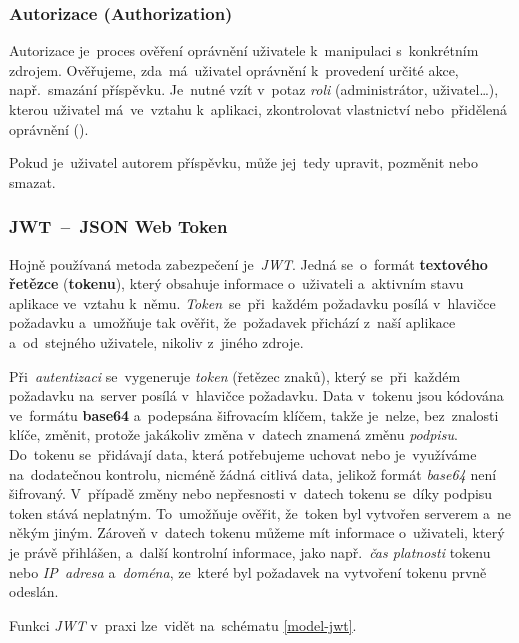 \documentclass[10pt,a4paper]{article}
\begin{document}
            \subsubsection{Autorizace (Authorization)}
                Autorizace je~proces ověření oprávnění uživatele k~manipulaci s~konkrétním zdrojem. Ověřujeme, zda~má~uživatel oprávnění k~provedení určité akce, např.~smazání příspěvku. Je~nutné vzít v~potaz \emph{roli} (administrátor, uživatel\dots), kterou uživatel má~ve~vztahu k~aplikaci, zkontrolovat vlastnictví nebo~přidělená oprávnění ().

                Pokud je~uživatel autorem příspěvku, může jej~tedy upravit, pozměnit nebo smazat. \cite{graham2021ethical}

            \subsubsection{JWT~--~JSON Web Token}
                Hojně používaná metoda zabezpečení je~\emph{JWT}. Jedná se~o~formát \textbf{textového řetězce} (\textbf{tokenu}), který obsahuje informace o~uživateli a~aktivním stavu aplikace ve~vztahu k~němu. \emph{Token}~se~při~každém požadavku posílá v~hlavičce požadavku a~umožňuje tak ověřit, že~požadavek přichází z~naší aplikace a~od~stejného uživatele, nikoliv z~jiného zdroje.
                
                Při~\emph{autentizaci} se~vygeneruje \emph{token} (řetězec znaků), který se~při~každém požadavku na~server posílá v~hlavičce požadavku. Data v~tokenu jsou kódována ve~formátu \textbf{base64} a~podepsána šifrovacím klíčem, takže je~nelze, bez~znalosti klíče, změnit, protože jakákoliv změna v~datech znamená změnu \emph{podpisu}. Do~tokenu se~přidávají data, která potřebujeme uchovat nebo je~využíváme na~dodatečnou kontrolu, nicméně žádná citlivá data, jelikož formát \emph{base64} není šifrovaný. V~případě změny nebo nepřesnosti v~datech tokenu se~díky podpisu token stává neplatným. To~umožňuje ověřit, že~token byl vytvořen serverem a~ne někým jiným. Zároveň v~datech tokenu můžeme mít informace o~uživateli, který je právě přihlášen, a~další kontrolní informace, jako např.~\emph{čas platnosti} tokenu nebo \emph{IP~adresa} a~\emph{doména}, ze~které byl požadavek na vytvoření tokenu prvně odeslán.

                Funkci \emph{JWT} v~praxi lze~vidět na~schématu \ref{model-jwt}.
\end{document}
